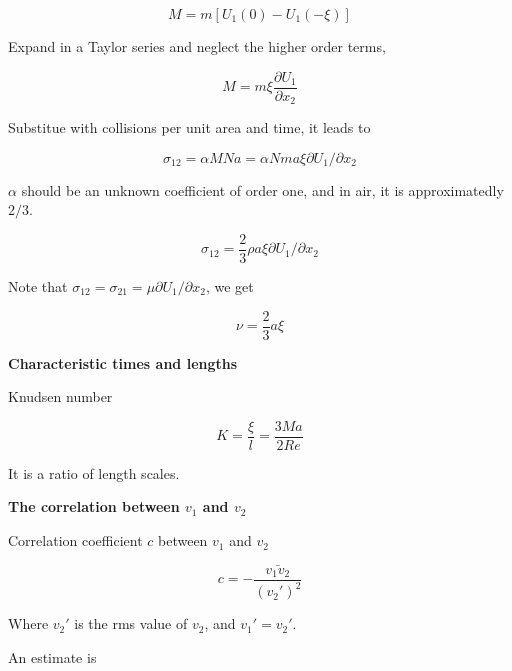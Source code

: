 \documentclass{article}
\begin{document}
\begin{equation*}
    M=m\left[U_1(0)-U_1(-\xi)\right]
\end{equation*}

Expand in a Taylor series and neglect the higher order terms,

\begin{equation*}
    M=m\xi\frac{\partial U_1}{\partial x_2}
\end{equation*}

Substitue with collisions per unit area and time, it leads to

\begin{equation*}
    \sigma_{12}=\alpha MNa=\alpha Nma\xi \partial U_1/\partial x_2
\end{equation*}

$\alpha$ should be an unknown coefficient of order one, and in air, it is approximatedly $2/3$.

\begin{equation*}
    \sigma_{12}=\frac{2}{3}\rho a\xi \partial U_1/\partial x_2
\end{equation*}

Note that $\sigma_{12}=\sigma_{21}=\mu\partial U_1/\partial x_2$, we get

\begin{equation*}
    \nu=\frac{2}{3}a\xi
\end{equation*}

%

\textbf{Characteristic times and lengths}

Knudsen number

\begin{equation*}
    K=\frac{\xi}{l}=\frac{3Ma}{2Re}
\end{equation*}

It is a ratio of length scales.

\textbf{The correlation between $v_1$ and $v_2$}

Correlation coefficient $c$ between $v_1$ and $v_2$

\begin{equation*}
    c=-\frac{\bar{v_1v_2}}{(v_2')^2}
\end{equation*}

Where $v_2'$ is the rms value of $v_2$, and $v_1'=v_2'$.

An estimate is
\end{document}
